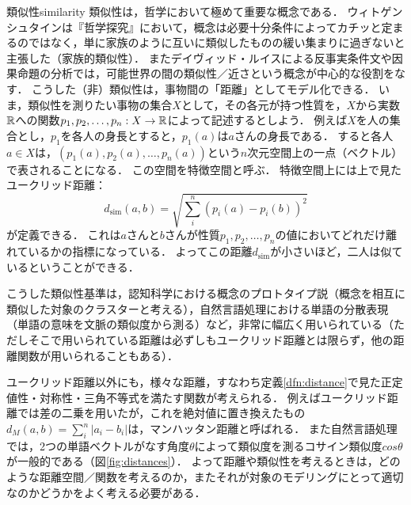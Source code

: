 \documentclass[11pt,a4paper, dvipdfmx]{jsarticle}
\begin{document}
\begin{rei}{類似性}{similarity}
類似性は，哲学において極めて重要な概念である．
ウィトゲンシュタインは『哲学探究』において，概念は必要十分条件によってカチッと定まるのではなく，単に家族のように互いに類似したものの緩い集まりに過ぎないと主張した（家族的類似性）．
またデイヴィッド・ルイスによる反事実条件文や因果命題の分析では，可能世界の間の類似性／近さという概念が中心的な役割をなす．
こうした（非）類似性は，事物間の「距離」としてモデル化できる．
いま，類似性を測りたい事物の集合$X$として，その各元が持つ性質を，$X$から実数$\mathbb{R}$への関数$p_1, p_2, \dots, p_n:X \to \mathbb{R}$によって記述するとしよう．
例えば$X$を人の集合とし，$p_1$を各人の身長とすると，$p_1(a)$は$a$さんの身長である．
すると各人$a \in X$は，$(p_1(a), p_2(a), \dots, p_n(a))$という$n$次元空間上の一点（ベクトル）で表されることになる．
この空間を特徴空間と呼ぶ．
特徴空間上には上で見たユークリッド距離：
  \[ d_{\text{sim}}(a, b) = \sqrt{\sum_i^n(p_i(a) - p_i(b))^2}\]
が定義できる．
これは$a$さんと$b$さんが性質$p_1, p_2, \dots, p_n$の値においてどれだけ離れているかの指標になっている．
よってこの距離$d_{\text{sim}}$が小さいほど，二人は似ているということができる．

こうした類似性基準は，認知科学における概念のプロトタイプ説（概念を相互に類似した対象のクラスターと考える），自然言語処理における単語の分散表現（単語の意味を文脈の類似度から測る）など，非常に幅広く用いられている（ただしそこで用いられている距離は必ずしもユークリッド距離とは限らず，他の距離関数が用いられることもある）．
\end{rei}

ユークリッド距離以外にも，様々な距離，すなわち定義\ref{dfn:distance}で見た正定値性・対称性・三角不等式を満たす関数が考えられる．
例えばユークリッド距離では差の二乗を用いたが，これを絶対値に置き換えたもの $d_M(a,b) = \sum_i^n|a_i - b_i|$は，マンハッタン距離と呼ばれる．
また自然言語処理では，2つの単語ベクトルがなす角度$\theta$によって類似度を測るコサイン類似度$cos\theta$が一般的である（図\ref{fig:distances}）．
よって距離や類似性を考えるときは，どのような距離空間／関数を考えるのか，またそれが対象のモデリングにとって適切なのかどうかをよく考える必要がある．
\end{document}

